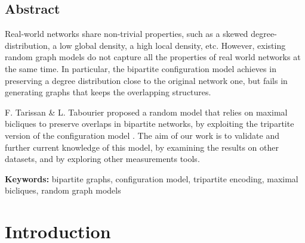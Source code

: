 \documentclass[table]{report}
\begin{document}

 
\dominitoc%
\tableofcontents


\newpage
\section*{Abstract}
Real-world networks share non-trivial properties, such as a skewed degree-distribution, a low global density, a high local density, etc. However, existing random graph models do not capture all the properties of real world networks at the same time. In particular, the bipartite configuration model achieves in preserving a degree distribution close to the original network one, but fails in generating graphs that keeps the overlapping structures.


\medbreak
F. Tarissan \& L. Tabourier proposed a random model that relies on maximal bicliques to preserve overlaps in bipartite networks, by exploiting the tripartite version of the configuration model \cite{fabien_lionel}. The aim of our work is to validate and further current knowledge of this model, by examining the results on other datasets, and by exploring other measurements tools.





%
%

\medbreak
\medbreak
\noindent
\textbf{Keywords:} bipartite graphs, configuration model, tripartite encoding, maximal bicliques, random graph models
\medbreak



\chapter{Introduction}
\end{document}
